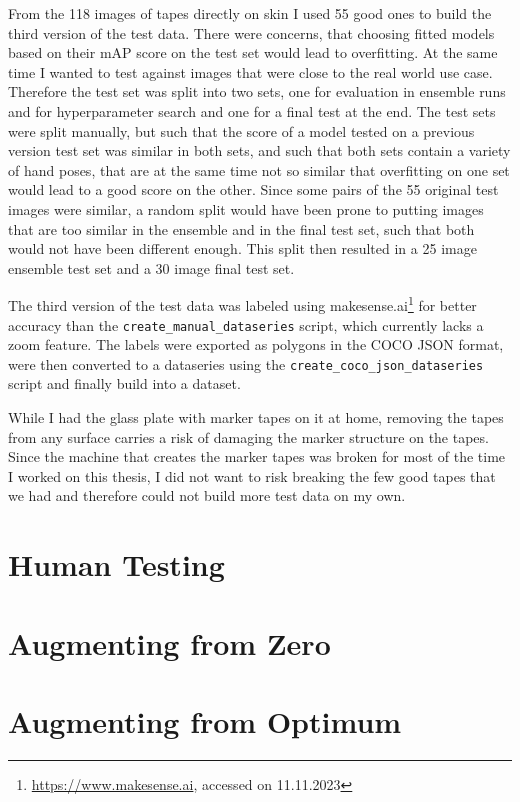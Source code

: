 \documentclass[10pt]{book}
\begin{document}
From the 118 images of tapes directly on skin I used 55 good ones to build the third version of the test data. There were concerns, that choosing fitted models based on their \ac{mAP} score on the test set would lead to overfitting. At the same time I wanted to test against images that were close to the real world use case. Therefore the test set was split into two sets, one for evaluation in ensemble runs and for hyperparameter search and one for a final test at the end. The test sets were split manually, but such that the score of a model tested on a previous version test set was similar in both sets, and such that both sets contain a variety of hand poses, that are at the same time not so similar that overfitting on one set would lead to a good score on the other. Since some pairs of the 55 original test images were similar, a random split would have been prone to putting images that are too similar in the ensemble and in the final test set, such that both would not have been different enough. This split then resulted in a 25 image ensemble test set and a 30 image final test set.

The third version of the test data was labeled using makesense.ai\footnote{\url{https://www.makesense.ai}, accessed on 11.11.2023} for better accuracy than the \texttt{create\_manual\_dataseries} script, which currently lacks a zoom feature. The labels were exported as polygons in the \ac{COCO} \ac{JSON} format, were then converted to a dataseries using the \texttt{create\_coco\_json\_dataseries} script and finally build into a dataset.

While I had the glass plate with marker tapes on it at home, removing the tapes from any surface carries a risk of damaging the marker structure on the tapes. Since the machine that creates the marker tapes was broken for most of the time I worked on this thesis, I did not want to risk breaking the few good tapes that we had and therefore could not build more test data on my own.

\section{Human Testing}

\section{Augmenting from Zero}

\section{Augmenting from Optimum}
\end{document}
